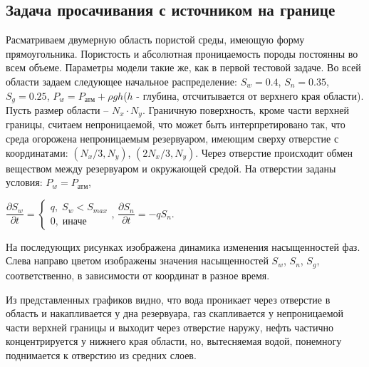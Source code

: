 \newpage
\subsection{Задача просачивания с источником на границе}
Расматриваем двумерную область пористой среды, имеющую форму
прямоугольника. Пористость и абсолютная проницаемость породы постоянны во всем
объеме. Параметры модели такие же, как
в первой тестовой задаче.
Во всей области задаем следующее 
начальное распределение: $S_w=0.4$,\; $S_n=0.35$,\; $S_g=0.25$, 
$P_w=P_\text{атм}+\rho g h$($h$ - глубина, отсчитывается от верхнего края области).
Пусть размер области -- $N_x\cdot N_y$.
Граничную поверхность, кроме части верхней границы, считаем непроницаемой, 
что может быть интерпретировано так,
что среда огорожена непроницаемым резервуаром, имеющим сверху отверстие с
координатами: $(N_x/3, N_y)$, $(2N_x/3, N_y)$. Через отверстие происходит обмен веществом между 
резервуаром и окружающей средой. На отверстии заданы условия: $P_w=P_\text{атм}$,

$ \dfrac{\partial S_w}{\partial t}= 
\begin{cases}
 q, \; S_w<S_{max}\\
 0, \; \text{иначе}
\end{cases}
$,
$ \dfrac{\partial S_n}{\partial t}=-q S_n$.

На последующих рисунках изображена динамика изменения насыщенностей 
фаз. Слева направо цветом изображены значения насыщенностей $S_w$, $S_n$, $S_g$, соответственно, 
в зависимости от координат в разное время.

Из представленных графиков видно, что вода проникает через отверстие в область и накапливается 
у дна резервуара, газ скапливается у непроницаемой части верхней границы и выходит через отверстие 
наружу, нефть частично концентрируется у нижнего края области, но, вытесняемая водой,
 понемногу поднимается к отверстию из средних слоев.
